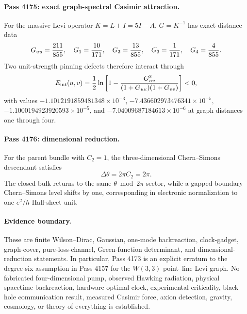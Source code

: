 \paragraph{Pass 4175: exact graph-spectral Casimir attraction.}
For the massive Levi operator $K=L+I=5I-A$, $G=K^{-1}$ has exact distance data
\[
G_{uu}={211\over855},\quad
G_1={10\over171},\quad
G_2={13\over855},\quad
G_3={1\over171},\quad
G_4={4\over855}.
\]
Two unit-strength pinning defects therefore interact through
\[
E_{\rm int}(u,v)={1\over2}\ln\left[1-{G_{uv}^2\over(1+G_{uu})(1+G_{vv})}\right]<0,
\]
with values $-1.1012191859481348\times10^{-3}$, $-7.436602973476341\times10^{-5}$, $-1.1000194923920593\times10^{-5}$, and $-7.04009687184613\times10^{-6}$ at graph distances one through four.

\paragraph{Pass 4176: dimensional reduction.}
For the parent bundle with $C_2=1$, the three-dimensional Chern--Simons descendant satisfies
\[
\Delta\theta=2\pi C_2=2\pi.
\]
The closed bulk returns to the same $\theta\bmod2\pi$ sector, while a gapped boundary Chern--Simons level shifts by one, corresponding in electronic normalization to one $e^2/h$ Hall-sheet unit.

\paragraph{Evidence boundary.}
These are finite Wilson--Dirac, Gaussian, one-mode backreaction, clock-gadget, graph-cover, pure-loss-channel, Green-function determinant, and dimensional-reduction statements.  In particular, Pass 4173 is an explicit erratum to the degree-six assumption in Pass 4157 for the $W(3,3)$ point--line Levi graph.  No fabricated four-dimensional pump, observed Hawking radiation, physical spacetime backreaction, hardware-optimal clock, experimental criticality, black-hole communication result, measured Casimir force, axion detection, gravity, cosmology, or theory of everything is established.
